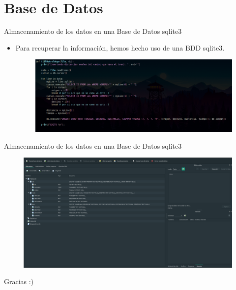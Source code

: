 \documentclass{beamer}
\begin{document}
\section{Base de Datos}
\begin{frame}{Almacenamiento de los datos en una Base de Datos sqlite3}
    \begin{itemize}
        \item Para recuperar la información, hemos hecho uso de una BDD sqlite3.
        \vspace{0.2cm}
        \begin{figure}[H]
          \centering
          \includegraphics[scale=0.20]{"../pics/bddCodigo.png"}
        \end{figure}
    \end{itemize}
\end{frame}
\begin{frame}{Almacenamiento de los datos en una Base de Datos sqlite3}
  \begin{figure}[H]
    \centering
    \includegraphics[scale=0.17]{"../pics/bdd.png"}
  \end{figure}
\end{frame}

\begin{frame}
  \Huge{\centerline{Gracias :)}}
\end{frame}

\end{document}
